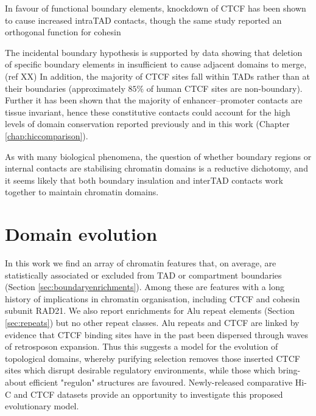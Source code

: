 \documentclass[a4paper,11pt,oneside]{book}
\begin{document}
In favour of functional boundary elements, knockdown of CTCF has been shown to cause increased intraTAD contacts,\cite{Zuin2013} though the same study reported an orthogonal function for cohesin

The incidental boundary hypothesis is supported by data showing that deletion of specific boundary elements in insufficient to cause adjacent domains to merge,(ref XX) In addition, the majority of CTCF sites fall within TADs rather than at their boundaries (approximately $85\%$ of human CTCF sites are non-boundary\cite{Dixon2012}). Further it has been shown that the majority of enhancer--promoter contacts are tissue invariant,\cite{Bouwman2015a} hence these constitutive contacts could account for the high levels of domain conservation reported previously\cite{Lieberman2009, Dixon2012, Chambers2013, Rao2014} and in this work (Chapter \ref{chap:hiccomparison}).

As with many biological phenomena, the question of whether boundary regions or internal contacts are stabilising chromatin domains is a reductive dichotomy, and it seems likely that both boundary insulation and interTAD contacts work together to maintain chromatin domains.

\section{Domain evolution}

In this work we find an array of chromatin features that, on average, are statistically associated or excluded from TAD or compartment boundaries (Section \ref{sec:boundaryenrichments}). Among these are features with a long history of implications in chromatin organisation, including CTCF and cohesin subunit RAD21. We also report enrichments for Alu repeat elements (Section \ref{sec:repeats}) but no other repeat classes. Alu repeats and CTCF are linked by evidence that CTCF binding sites have in the past been dispersed through waves of retrosposon expansion.\cite{Schmidt2012, Nikolaev2009} Thus this suggests a model for the evolution of topological domains, whereby purifying selection removes those inserted CTCF sites which disrupt desirable regulatory environments, while those which bring-about efficient "regulon" structures are favoured. Newly-released comparative Hi-C and CTCF datasets\cite{VietriRudan2015} provide an opportunity to investigate this proposed evolutionary model. 

\end{document}
